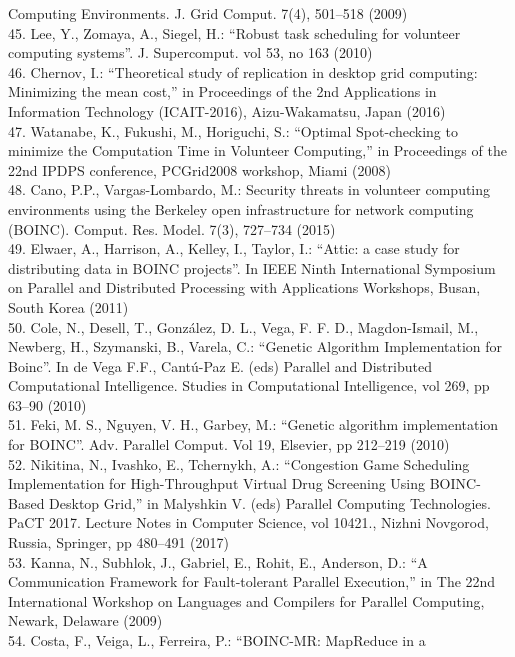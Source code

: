 \documentclass[
]{article}
\begin{document}
Computing Environments. J. Grid Comput. 7(4), 501--518 (2009)\\
45. Lee, Y., Zomaya, A., Siegel, H.: ``Robust task scheduling for
volunteer computing systems''. J. Supercomput. vol 53, no 163 (2010)\\
46. Chernov, I.: ``Theoretical study of replication in desktop grid
computing: Minimizing the mean cost,'' in Proceedings of the 2nd
Applications in Information Technology (ICAIT-2016), Aizu-Wakamatsu,
Japan (2016)\\
47. Watanabe, K., Fukushi, M., Horiguchi, S.: ``Optimal Spot-checking to
minimize the Computation Time in Volunteer Computing,'' in Proceedings
of the 22nd IPDPS conference, PCGrid2008 workshop, Miami (2008)\\
48. Cano, P.P., Vargas-Lombardo, M.: Security threats in volunteer
computing environments using the Berkeley open infrastructure for
network computing (BOINC). Comput. Res. Model. 7(3), 727--734 (2015)\\
49. Elwaer, A., Harrison, A., Kelley, I., Taylor, I.: ``Attic: a case
study for distributing data in BOINC projects''. In IEEE Ninth
International Symposium on Parallel and Distributed Processing with
Applications Workshops, Busan, South Korea (2011)\\
50. Cole, N., Desell, T., González, D. L., Vega, F. F. D.,
Magdon-Ismail, M., Newberg, H., Szymanski, B., Varela, C.: ``Genetic
Algorithm Implementation for Boinc''. In de Vega F.F., Cantú-Paz E.
(eds) Parallel and Distributed Computational Intelligence. Studies in
Computational Intelligence, vol 269, pp 63--90 (2010)\\
51. Feki, M. S., Nguyen, V. H., Garbey, M.: ``Genetic algorithm
implementation for BOINC''. Adv. Parallel Comput. Vol 19, Elsevier, pp
212--219 (2010)\\
52. Nikitina, N., Ivashko, E., Tchernykh, A.: ``Congestion Game
Scheduling Implementation for High-Throughput Virtual Drug Screening
Using BOINC-Based Desktop Grid,'' in Malyshkin V. (eds) Parallel
Computing Technologies. PaCT 2017. Lecture Notes in Computer Science,
vol 10421., Nizhni Novgorod, Russia, Springer, pp 480--491 (2017)\\
53. Kanna, N., Subhlok, J., Gabriel, E., Rohit, E., Anderson, D.: ``A
Communication Framework for Fault-tolerant Parallel Execution,'' in The
22nd International Workshop on Languages and Compilers for Parallel
Computing, Newark, Delaware (2009)\\
54. Costa, F., Veiga, L., Ferreira, P.: ``BOINC-MR: MapReduce in a
\end{document}
